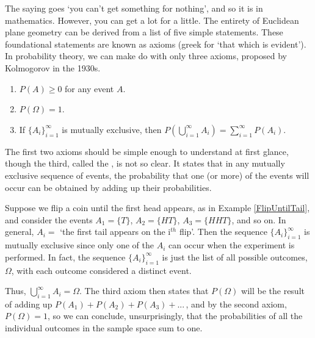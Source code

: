The saying goes `you can't get something for nothing', and so it is in mathematics. However, you can get a lot for a little. The entirety of Euclidean plane geometry can be derived from a list of five simple statements. These foundational statements are known as axioms (greek for `that which is evident'). In probability theory, we can make do with only three axioms, proposed by Kolmogorov \cite{KolmogorovFoundations} in the 1930s. 
\begin{enumerate}
\item $P(A) \geq 0$ for any event $A$.
\item $P(\Omega) = 1$.
\vspace*{-7pt}
\item If $\{A_i\}_{i=1}^{\infty}$ is mutually exclusive, then $\displaystyle P\left(\bigcup_{i=1}^{\infty} A_i\right) = \sum_{i=1}^{\infty} P(A_i)$.
\end{enumerate}
\par
The first two axioms should be simple enough to understand at first glance, though the third, called the , is not so clear. It states that in any mutually exclusive sequence of events, the probability that one (or more) of the events will occur can be obtained by adding up their probabilities.
\par
\begin{examp}\label{flipuntiltailsumoutcomes}
Suppose we flip a coin until the first head appears, as in Example \ref{FlipUntilTail}, and consider the events $A_1 = \{T\}$, $A_2 = \{HT\}$, $A_3 = \{HHT\}$, and so on. In general, $A_i =$ `the first tail appears on the i$^{th}$ flip'. Then the sequence $\{A_i\}_{i=1}^{\infty}$ is mutually exclusive since only one of the $A_i$ can occur when the experiment is performed. In fact, the sequence $\{A_i\}_{i=1}^{\infty}$ is just the list of all possible outcomes, $\Omega$, with each outcome considered a distinct event.
\par
\noindent Thus, $\bigcup_{i=1}^{\infty}A_i = \Omega$. The third axiom then states that $P(\Omega)$ will be the result of adding up $P(A_1) + P(A_2) + P(A_3) + ...\,$, and by the second axiom, $P(\Omega) = 1$, so we can conclude, unsurprisingly, that the probabilities of all the individual outcomes in the sample space sum to one.
\end{examp}
\par
